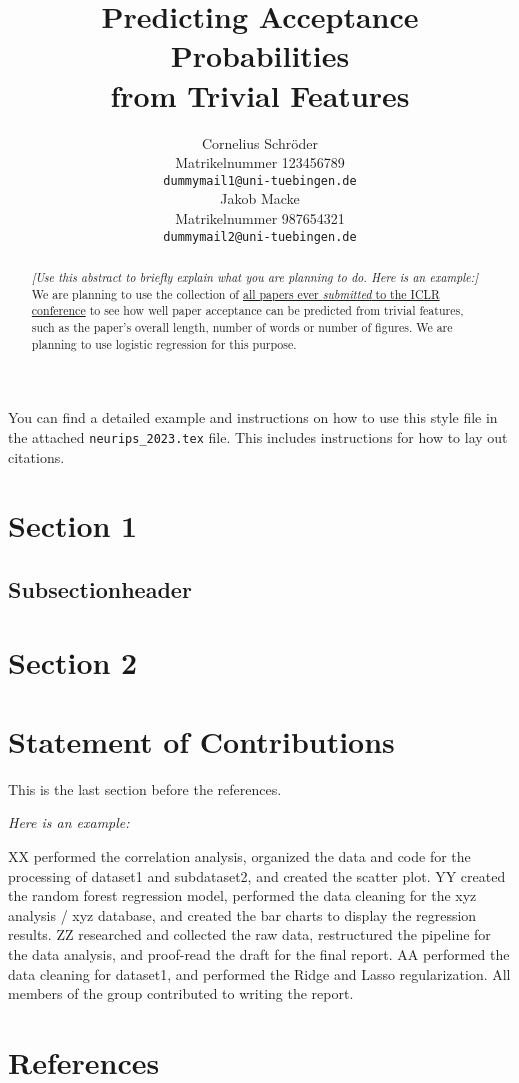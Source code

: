 \documentclass{article}
\title{Predicting Acceptance Probabilities\\ from Trivial Features}
\author{%
  Cornelius Schröder\\
  Matrikelnummer 123456789\\
  \texttt{dummymail1@uni-tuebingen.de} \\
  \And
  Jakob Macke\\
  Matrikelnummer 987654321\\
  \texttt{dummymail2@uni-tuebingen.de} \\
}
\begin{document}
\maketitle

\begin{abstract}
  \emph{[Use this abstract to briefly explain what you are planning to do. Here is an example:]} We are planning to use the collection of \href{https://openreview-py.readthedocs.io/en/latest/getting_data.html}{all papers ever \emph{submitted} to the ICLR conference} to see how well paper acceptance can be predicted from trivial features, such as the paper's overall length, number of words or number of figures. We are planning to use logistic regression for this purpose.
\end{abstract}

You can find a detailed example and instructions on how to use this style file in the attached \texttt{neurips\_2023.tex} file. This includes instructions for how to lay out citations.

\section{Section 1}
\subsection{Subsectionheader}

\section{Section 2}

\section{Statement of Contributions}
This is the last section before the references. 

\emph{Here is an example:}

XX performed the correlation analysis, organized the data and code for the processing of dataset1 and subdataset2, and created the scatter plot. 
YY created the random forest regression model, performed the data cleaning for the xyz analysis / xyz database, and created the bar charts to display the regression results. 
ZZ researched and collected the raw data, restructured the pipeline for the data analysis, and proof-read the draft for the final report. 
AA performed the data cleaning for dataset1, and performed the Ridge and Lasso regularization. 
All members of the group contributed to writing the report.

\section*{References}
\end{document}
